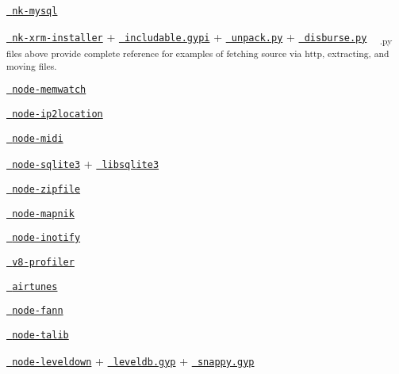 \begin{DoxyItemize}
\item \href{https://github.com/mmod/nodamysql/blob/master/binding.gyp}{\texttt{ nk-\/mysql}}
\item \href{https://github.com/mmod/nk-xrm-installer/blob/master/binding.gyp}{\texttt{ nk-\/xrm-\/installer}} + \href{https://github.com/mmod/nk-xrm-installer/blob/master/includable.gypi}{\texttt{ includable.\+gypi}} + \href{https://github.com/mmod/nk-xrm-installer/blob/master/unpack.py}{\texttt{ unpack.\+py}} + \href{https://github.com/mmod/nk-xrm-installer/blob/master/disburse.py}{\texttt{ disburse.\+py}} ~\newline
 \textsubscript{.py files above provide complete reference for examples of fetching source via http, extracting, and moving files.}
\item \href{https://github.com/lloyd/node-memwatch/blob/master/binding.gyp}{\texttt{ node-\/memwatch}}
\item \href{https://github.com/bolgovr/node-ip2location/blob/master/binding.gyp}{\texttt{ node-\/ip2location}}
\item \href{https://github.com/justinlatimer/node-midi/blob/master/binding.gyp}{\texttt{ node-\/midi}}
\item \href{https://github.com/developmentseed/node-sqlite3/blob/master/binding.gyp}{\texttt{ node-\/sqlite3}} + \href{https://github.com/developmentseed/node-sqlite3/blob/master/deps/sqlite3.gyp}{\texttt{ libsqlite3}}
\item \href{https://github.com/mapbox/node-zipfile/blob/master/binding.gyp}{\texttt{ node-\/zipfile}}
\item \href{https://github.com/mapnik/node-mapnik/blob/master/binding.gyp}{\texttt{ node-\/mapnik}}
\item \href{https://github.com/c4milo/node-inotify/blob/master/binding.gyp}{\texttt{ node-\/inotify}}
\item \href{https://github.com/c4milo/v8-profiler/blob/master/binding.gyp}{\texttt{ v8-\/profiler}}
\item \href{https://github.com/radioline/node_airtunes/blob/master/binding.gyp}{\texttt{ airtunes}}
\item \href{https://github.com/c4milo/node-fann/blob/master/binding.gyp}{\texttt{ node-\/fann}}
\item \href{https://github.com/oransel/node-talib/blob/master/binding.gyp}{\texttt{ node-\/talib}}
\item \href{https://github.com/rvagg/node-leveldown/blob/master/binding.gyp}{\texttt{ node-\/leveldown}} + \href{https://github.com/rvagg/node-leveldown/blob/master/deps/leveldb/leveldb.gyp}{\texttt{ leveldb.\+gyp}} + \href{https://github.com/rvagg/node-leveldown/blob/master/deps/snappy/snappy.gyp}{\texttt{ snappy.\+gyp}}

\end{DoxyItemize}
